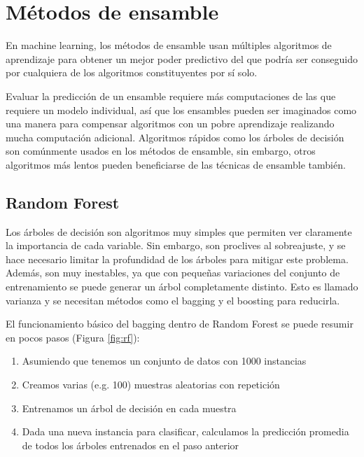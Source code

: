 \section{Métodos de ensamble}

En machine learning, los métodos de ensamble usan múltiples algoritmos de aprendizaje para obtener un mejor poder predictivo del que podría ser conseguido por cualquiera de los algoritmos constituyentes por sí solo.

Evaluar la predicción de un ensamble requiere más computaciones de las que requiere un modelo individual, así que los ensambles pueden ser imaginados como una manera para compensar algoritmos con un pobre aprendizaje realizando mucha computación adicional. Algoritmos rápidos como los árboles de decisión son comúnmente usados en los métodos de ensamble, sin embargo, otros algoritmos más lentos pueden beneficiarse de las técnicas de ensamble también.

\subsection{Random Forest}

Los árboles de decisión son algoritmos muy simples que permiten ver claramente la importancia de cada variable. Sin embargo, son proclives al sobreajuste, y se hace necesario limitar la profundidad de los árboles para mitigar este problema. Además, son muy inestables, ya que con pequeñas variaciones del conjunto de entrenamiento se puede generar un árbol completamente distinto. Esto es llamado varianza y se necesitan métodos como el bagging y el boosting para reducirla.

El funcionamiento básico del bagging dentro de Random Forest se puede resumir en pocos pasos (Figura \ref{fig:rf}):

\begin{enumerate}
    \item Asumiendo que tenemos un conjunto de datos con 1000 instancias
    \item Creamos varias (e.g. 100) muestras aleatorias con repetición
    \item Entrenamos un árbol de decisión en cada muestra
    \item Dada una nueva instancia para clasificar, calculamos la predicción promedia de todos los árboles entrenados en el paso anterior
\end{enumerate}

